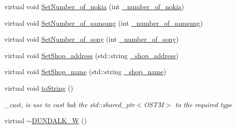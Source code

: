\begin{DoxyCompactItemize}
\item 
virtual void \hyperlink{class_d_u_n_d_a_l_k___w_a9ea7d9efdcbb7f39c111442b68604ee4_a9ea7d9efdcbb7f39c111442b68604ee4}{Set\+Number\+\_\+of\+\_\+nokia} (int \hyperlink{class_d_u_n_d_a_l_k___w_a8e794ecf0c55b5606a8f4a0ab214c657_a8e794ecf0c55b5606a8f4a0ab214c657}{\+\_\+number\+\_\+of\+\_\+nokia})
\item 
virtual void \hyperlink{class_d_u_n_d_a_l_k___w_a55cb57ef915fac44c82570f6d41a023f_a55cb57ef915fac44c82570f6d41a023f}{Set\+Number\+\_\+of\+\_\+samsung} (int \hyperlink{class_d_u_n_d_a_l_k___w_afec98ddc022c03aaaaa2848e5ca7cfb3_afec98ddc022c03aaaaa2848e5ca7cfb3}{\+\_\+number\+\_\+of\+\_\+samsung})
\item 
virtual void \hyperlink{class_d_u_n_d_a_l_k___w_ab08434d18efd64e98600e34f27e0b753_ab08434d18efd64e98600e34f27e0b753}{Set\+Number\+\_\+of\+\_\+sony} (int \hyperlink{class_d_u_n_d_a_l_k___w_a9a40b513a6d4153a9a0f37ce47429369_a9a40b513a6d4153a9a0f37ce47429369}{\+\_\+number\+\_\+of\+\_\+sony})
\item 
virtual void \hyperlink{class_d_u_n_d_a_l_k___w_a2aa44fd4b48eeb979fbd167f2aea3811_a2aa44fd4b48eeb979fbd167f2aea3811}{Set\+Shop\+\_\+address} (std\+::string \hyperlink{class_d_u_n_d_a_l_k___w_a84ef96f22ec520afc66bb26b0d264475_a84ef96f22ec520afc66bb26b0d264475}{\+\_\+shop\+\_\+address})
\item 
virtual void \hyperlink{class_d_u_n_d_a_l_k___w_ace86d535779fc3f953e9654e21ba5c40_ace86d535779fc3f953e9654e21ba5c40}{Set\+Shop\+\_\+name} (std\+::string \hyperlink{class_d_u_n_d_a_l_k___w_ac9018980d31ba581cd83b07df0b171e2_ac9018980d31ba581cd83b07df0b171e2}{\+\_\+shop\+\_\+name})
\item 
virtual void \hyperlink{class_d_u_n_d_a_l_k___w_aef2a8301835c60c21f9f3199259fed87_aef2a8301835c60c21f9f3199259fed87}{to\+String} ()
\begin{DoxyCompactList}\small\item\em \+\_\+cast, is use to cast bak the std\+::shared\+\_\+ptr$<$\+O\+S\+T\+M$>$ to the required type \end{DoxyCompactList}\item 
virtual \hyperlink{class_d_u_n_d_a_l_k___w_a91d26f413bf5bc2d089b77036f7fbfa9_a91d26f413bf5bc2d089b77036f7fbfa9}{$\sim$\+D\+U\+N\+D\+A\+L\+K\+\_\+W} ()
\end{DoxyCompactItemize}
